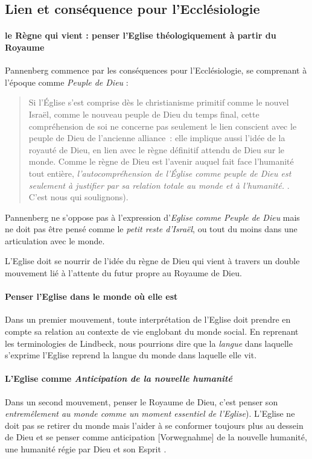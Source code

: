 \subsection{Lien et conséquence pour l'Ecclésiologie}
\paragraph{le Règne qui vient : penser l'Eglise théologiquement à partir du Royaume}
Pannenberg commence par les conséquences pour l'Ecclésiologie, se comprenant à l'époque comme \textit{Peuple de Dieu} : 
\begin{quote}
   Si l’Église s’est comprise dès le christianisme primitif comme le nouvel Israël, comme le nouveau peuple de Dieu du temps final, cette compréhension de soi ne concerne pas seulement le lien conscient avec le peuple de Dieu de l’ancienne alliance : elle implique aussi l’idée de la royauté de Dieu, en lien avec le règne définitif attendu de Dieu sur le monde. Comme le règne de Dieu est l’avenir auquel fait face l’humanité tout entière, \textit{l’autocompréhension de l’Église comme peuple de Dieu est seulement à justifier par sa relation totale au monde et à l’humanité. }\cite[pp. 75]{Pannenberg:RoyaumeDieu}. C'est nous qui soulignons). 
\end{quote}
 Pannenberg ne s'oppose pas à l'expression d'\textit{Eglise comme Peuple de Dieu} mais ne doit pas être pensé comme le \textit{petit reste d'Israël}, ou tout du moins dans une articulation avec le monde.

 L'Eglise doit se nourrir de l’idée du règne de Dieu qui vient \cite[pp. 76]{Pannenberg:RoyaumeDieu} à travers un double mouvement lié à l'attente du futur propre au Royaume de Dieu. 
 
 \paragraph{Penser l'Eglise dans le monde où elle est}
 Dans un premier mouvement, toute interprétation de l'Eglise doit prendre en compte sa relation au contexte de vie englobant du monde social. En reprenant les terminologies de Lindbeck, nous pourrions dire que la \textit{langue} dans laquelle s'exprime l'Eglise reprend la langue du monde dans laquelle elle vit.
    
\paragraph{L'Eglise comme \textit{Anticipation de la nouvelle humanité}}
Dans un second mouvement, penser le Royaume de Dieu, c'est  penser son \textit{entremêlement au monde comme un moment essentiel de l'Eglise}\cite[pp. 76]{Pannenberg:RoyaumeDieu}). L'Eglise ne doit pas se retirer du monde mais l'aider à se conformer toujours plus au dessein de Dieu et se penser comme anticipation [Vorwegnahme] de la nouvelle humanité, une humanité régie par Dieu et son Esprit \cite[pp. 76-77]{Pannenberg:RoyaumeDieu}.  


